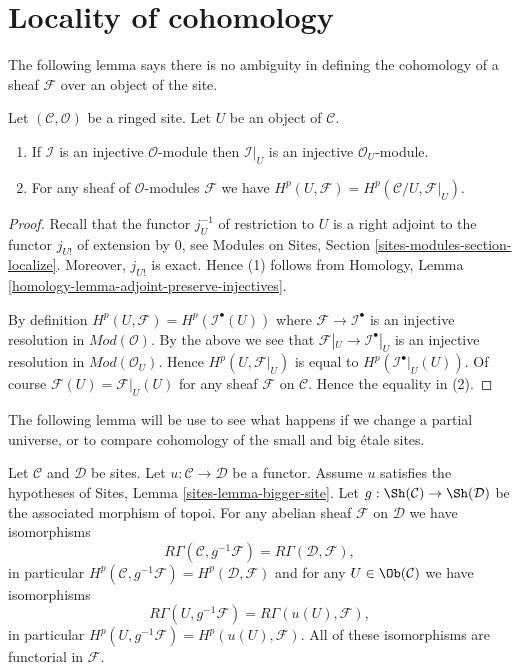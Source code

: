 \section{Locality of cohomology}
\label{section-locality}

\noindent
The following lemma says there is no ambiguity in defining the cohomology
of a sheaf $\mathcal{F}$ over an object of the site.

\begin{lemma}
\label{lemma-cohomology-of-open}
Let $(\mathcal{C}, \mathcal{O})$ be a ringed site.
Let $U$ be an object of $\mathcal{C}$.
\begin{enumerate}
\item If $\mathcal{I}$ is an injective $\mathcal{O}$-module
then $\mathcal{I}|_U$ is an injective $\mathcal{O}_U$-module.
\item For any sheaf of $\mathcal{O}$-modules $\mathcal{F}$ we have
$H^p(U, \mathcal{F}) = H^p(\mathcal{C}/U, \mathcal{F}|_U)$.
\end{enumerate}
\end{lemma}

\begin{proof}
Recall that the functor $j_U^{-1}$ of restriction to $U$ is a right adjoint
to the functor $j_{U!}$ of extension by $0$, see
Modules on Sites, Section
\ref{sites-modules-section-localize}.
Moreover, $j_{U!}$ is exact. Hence (1) follows from
Homology, Lemma \ref{homology-lemma-adjoint-preserve-injectives}.

\medskip\noindent
By definition $H^p(U, \mathcal{F}) = H^p(\mathcal{I}^\bullet(U))$
where $\mathcal{F} \to \mathcal{I}^\bullet$ is an injective resolution
in $\textit{Mod}(\mathcal{O})$.
By the above we see that $\mathcal{F}|_U \to \mathcal{I}^\bullet|_U$
is an injective resolution in $\textit{Mod}(\mathcal{O}_U)$.
Hence $H^p(U, \mathcal{F}|_U)$ is equal to
$H^p(\mathcal{I}^\bullet|_U(U))$.
Of course $\mathcal{F}(U) = \mathcal{F}|_U(U)$ for
any sheaf $\mathcal{F}$ on $\mathcal{C}$.
Hence the equality in (2).
\end{proof}

\noindent
The following lemma will be use to see what happens if we change a
partial universe, or to compare cohomology of the small and big \'etale
sites.

\begin{lemma}
\label{lemma-cohomology-bigger-site}
Let $\mathcal{C}$ and $\mathcal{D}$ be sites.
Let $u : \mathcal{C} \to \mathcal{D}$ be a functor.
Assume $u$ satisfies the hypotheses of
Sites, Lemma \ref{sites-lemma-bigger-site}.
Let $g : \Sh(\mathcal{C}) \to \Sh(\mathcal{D})$
be the associated morphism of topoi.
For any abelian sheaf $\mathcal{F}$ on $\mathcal{D}$ we have
isomorphisms
$$
R\Gamma(\mathcal{C}, g^{-1}\mathcal{F}) = R\Gamma(\mathcal{D}, \mathcal{F}),
$$
in particular
$H^p(\mathcal{C}, g^{-1}\mathcal{F}) = H^p(\mathcal{D}, \mathcal{F})$
and for any $U \in \Ob(\mathcal{C})$ we have isomorphisms
$$
R\Gamma(U, g^{-1}\mathcal{F}) = R\Gamma(u(U), \mathcal{F}),
$$
in particular
$H^p(U, g^{-1}\mathcal{F}) = H^p(u(U), \mathcal{F})$. All of these
isomorphisms are functorial in $\mathcal{F}$.
\end{lemma}

